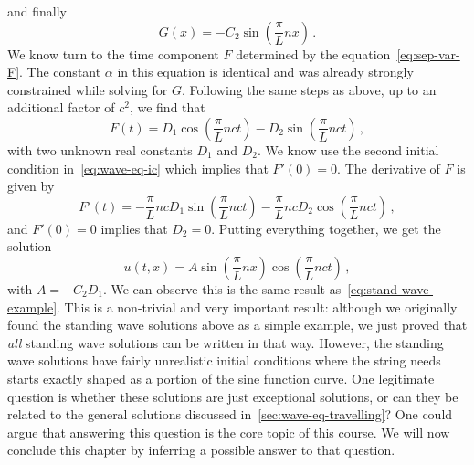 and finally
\begin{equation}
  G(x)=-C_2\sin\left(\frac{\pi}{L}nx\right)\,.
\end{equation}
We know turn to the time component $F$ determined by the equation~\cref{eq:sep-var-F}. The constant $\alpha$ in this equation is identical and was already strongly constrained while solving for $G$. Following the same steps as above, up to an additional factor of $c^2$, we find that
\begin{equation}
  F(t)=D_1\cos\left(\frac{\pi}{L}nc t\right)-D_2\sin\left(\frac{\pi}{L}nc t\right)\,,
\end{equation}
with two unknown real constants $D_1$ and $D_2$. We know use the second initial condition in~\cref{eq:wave-eq-ic} which implies that $F'(0)=0$. The derivative of $F$ is given by
\begin{equation}
  F'(t)=-\frac{\pi}{L}ncD_1\sin\left(\frac{\pi}{L}nc t\right)-\frac{\pi}{L}ncD_2\cos\left(\frac{\pi}{L}nc t\right)\,,
\end{equation}
and $F'(0)=0$ implies that $D_2=0$. Putting everything together, we get the solution
\begin{equation}
  u(t,x)=A\sin\left(\frac{\pi}{L}nx\right)\cos\left(\frac{\pi}{L}nct\right)\,,
\end{equation}
with $A=-C_2D_1$. We can observe this is the same result as~\cref{eq:stand-wave-example}. This is a non-trivial and very important result: although we originally found the standing wave solutions above as a simple example, we just proved that \emph{all} standing wave solutions can be written in that way. However, the standing wave solutions have fairly unrealistic initial conditions where the string needs starts exactly shaped as a portion of the sine function curve. One legitimate question is whether these solutions are just exceptional solutions, or can they be related to the general solutions discussed in~\cref{sec:wave-eq-travelling}? One could argue that answering this question is the core topic of this course. We will now conclude this chapter by inferring a possible answer to that question.
